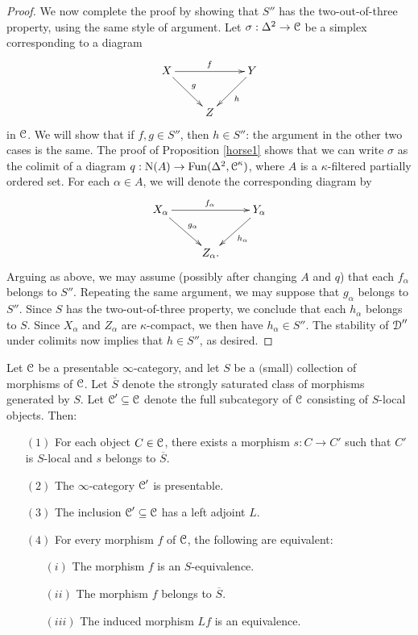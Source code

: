 \begin{proof}
We now complete the proof by showing that $S''$ has the two-out-of-three property, using the same style of argument. 
Let $\sigma: \Delta^2 \rightarrow \operatorname{\mathcal{C}}$ be a simplex corresponding to a diagram
$$ \xymatrix{ X \ar[rr]^{f} \ar[dr]^{g} & & Y \ar[dl]^{h} \\
& Z & }$$
in $\operatorname{\mathcal{C}}$. We will show that if $f,g \in S''$, then $h \in S''$: the argument in the other two cases is the same. The proof of Proposition \ref{horse1} shows that we can write $\sigma$
as the colimit of a diagram $q: \operatorname{N}(A) \rightarrow \operatorname{Fun}(\Delta^2,\operatorname{\mathcal{C}}^{\kappa})$, where
$A$ is a $\kappa$-filtered partially ordered set. For each $\alpha \in A$, we will denote the
corresponding diagram by
$$ \xymatrix{ X_{\alpha} \ar[rr]^{f_{\alpha}} \ar[dr]^{g_{\alpha}} & & Y_{\alpha} \ar[dl]^{h_{\alpha}} \\
& Z_{\alpha}. & }$$
Arguing as above, we may assume (possibly after changing $A$ and $q$) that each
$f_{\alpha}$ belongs to $S''$. Repeating the same argument, we may suppose that
$g_{\alpha}$ belongs to $S''$. Since $S$ has the two-out-of-three property, we conclude that each $h_{\alpha}$ belongs to $S$. Since $X_{\alpha}$ and $Z_{\alpha}$ are $\kappa$-compact, we then have $h_{\alpha} \in S''$. The stability of $\operatorname{\mathcal{D}}''$ under colimits now implies that $h \in S''$, as desired.
\end{proof}

\begin{proposition}\label{local}
Let $\operatorname{\mathcal{C}}$ be a presentable $\infty$-category, and let $S$ be a $($small$)$ collection of morphisms of $\operatorname{\mathcal{C}}$. Let $\overline{S}$ denote the strongly saturated class of morphisms generated by $S$.
Let $\operatorname{\mathcal{C}}' \subseteq \operatorname{\mathcal{C}}$ denote the full subcategory of $\operatorname{\mathcal{C}}$ consisting of $S$-local objects. Then:

\begin{itemize}
\item[$(1)$] For each object $C \in \operatorname{\mathcal{C}}$, there exists a morphism $s: C \rightarrow C'$ such that
$C'$ is $S$-local and $s$ belongs to $\overline{S}$.
\item[$(2)$] The $\infty$-category $\operatorname{\mathcal{C}}'$ is presentable.
\item[$(3)$] The inclusion $\operatorname{\mathcal{C}}' \subseteq \operatorname{\mathcal{C}}$ has a left adjoint $L$.
\item[$(4)$] For every morphism $f$ of $\operatorname{\mathcal{C}}$, the following are equivalent:
\begin{itemize}
\item[$(i)$] The morphism $f$ is an $S$-equivalence.
\item[$(ii)$] The morphism $f$ belongs to $\overline{S}$.
\item[$(iii)$] The induced morphism $Lf$ is an equivalence.
\end{itemize}
\end{itemize}
\end{proposition}

